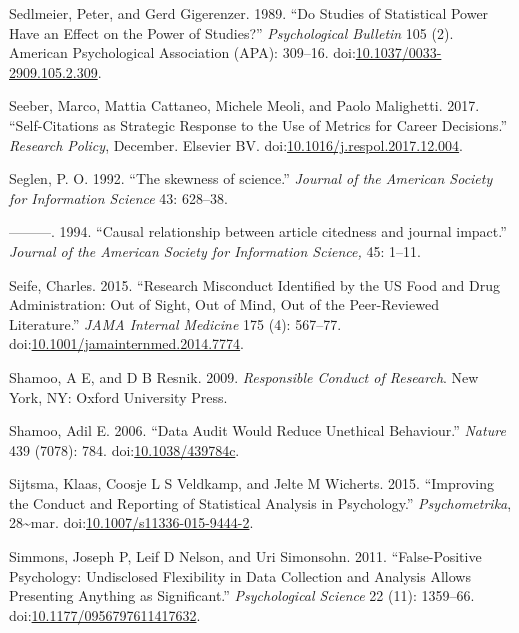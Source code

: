 \documentclass[a5paper]{book}
\begin{document}
\hypertarget{ref-doi:10.1037ux2f0033-2909.105.2.309}{}
Sedlmeier, Peter, and Gerd Gigerenzer. 1989. ``Do Studies of Statistical
Power Have an Effect on the Power of Studies?'' \emph{Psychological
Bulletin} 105 (2). American Psychological Association (APA): 309--16.
doi:\href{https://doi.org/10.1037/0033-2909.105.2.309}{10.1037/0033-2909.105.2.309}.

\hypertarget{ref-doi:10.1016ux2fj.respol.2017.12.004}{}
Seeber, Marco, Mattia Cattaneo, Michele Meoli, and Paolo Malighetti.
2017. ``Self-Citations as Strategic Response to the Use of Metrics for
Career Decisions.'' \emph{Research Policy}, December. Elsevier BV.
doi:\href{https://doi.org/10.1016/j.respol.2017.12.004}{10.1016/j.respol.2017.12.004}.

\hypertarget{ref-Seglen1992}{}
Seglen, P. O. 1992. ``The skewness of science.'' \emph{Journal of the
American Society for Information Science} 43: 628--38.

\hypertarget{ref-Seglen1994}{}
---------. 1994. ``Causal relationship between article citedness and
journal impact.'' \emph{Journal of the American Society for Information
Science,} 45: 1--11.

\hypertarget{ref-doi:10.1001ux2fjamainternmed.2014.7774}{}
Seife, Charles. 2015. ``Research Misconduct Identified by the US Food
and Drug Administration: Out of Sight, Out of Mind, Out of the
Peer-Reviewed Literature.'' \emph{JAMA Internal Medicine} 175 (4):
567--77.
doi:\href{https://doi.org/10.1001/jamainternmed.2014.7774}{10.1001/jamainternmed.2014.7774}.

\hypertarget{ref-isbn:9780199376025}{}
Shamoo, A E, and D B Resnik. 2009. \emph{Responsible Conduct of
Research}. New York, NY: Oxford University Press.

\hypertarget{ref-doi:10.1038ux2f439784c}{}
Shamoo, Adil E. 2006. ``Data Audit Would Reduce Unethical Behaviour.''
\emph{Nature} 439 (7078): 784.
doi:\href{https://doi.org/10.1038/439784c}{10.1038/439784c}.

\hypertarget{ref-doi:10.1007ux2fs11336-015-9444-2}{}
Sijtsma, Klaas, Coosje L S Veldkamp, and Jelte M Wicherts. 2015.
``Improving the Conduct and Reporting of Statistical Analysis in
Psychology.'' \emph{Psychometrika}, 28\textasciitilde{}mar.
doi:\href{https://doi.org/10.1007/s11336-015-9444-2}{10.1007/s11336-015-9444-2}.

\hypertarget{ref-doi:10.1177ux2f0956797611417632}{}
Simmons, Joseph P, Leif D Nelson, and Uri Simonsohn. 2011.
``False-Positive Psychology: Undisclosed Flexibility in Data Collection
and Analysis Allows Presenting Anything as Significant.''
\emph{Psychological Science} 22 (11): 1359--66.
doi:\href{https://doi.org/10.1177/0956797611417632}{10.1177/0956797611417632}.
\end{document}
